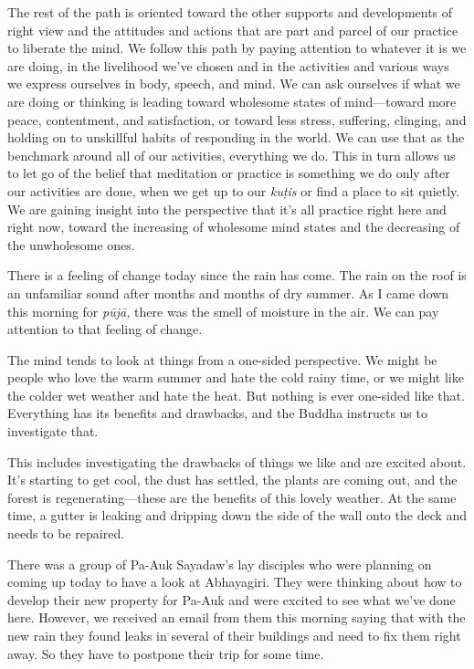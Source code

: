 The rest of the path is oriented toward the other supports and 
developments of right view and the attitudes and actions that are part 
and parcel of our practice to liberate the mind. We follow this path by 
paying attention to whatever it is we are doing, in the livelihood 
we've chosen and in the activities and various ways we express 
ourselves in body, speech, and mind. We can ask ourselves if what we 
are doing or thinking is leading toward wholesome states of 
mind---toward more peace, contentment, and satisfaction, or toward less 
stress, suffering, clinging, and holding on to unskillful habits of 
responding in the world. We can use that as the benchmark around all of 
our activities, everything we do. This in turn allows us to let go of 
the belief that meditation or practice is something we do only after 
our activities are done, when we get up to our \emph{kuṭis} or find a 
place to sit quietly. We are gaining insight into the perspective that 
it's all practice right here and right now, toward the increasing of 
wholesome mind states and the decreasing of the unwholesome ones.


There is a feeling of change today since the rain has come. The rain on 
the roof is an unfamiliar sound after months and months of dry summer. 
As I came down this morning for \emph{pūjā,} there was the smell of 
moisture in the air. We can pay attention to that feeling of change.

The mind tends to look at things from a one-sided perspective. We might 
be people who love the warm summer and hate the cold rainy time, or we 
might like the colder wet weather and hate the heat. But nothing is 
ever one-sided like that. Everything has its benefits and drawbacks, 
and the Buddha instructs us to investigate that.

This includes investigating the drawbacks of things we like and are 
excited about. It's starting to get cool, the dust has settled, the 
plants are coming out, and the forest is regenerating---these are the 
benefits of this lovely weather. At the same time, a gutter is leaking 
and dripping down the side of the wall onto the deck and needs to be 
repaired.

There was a group of Pa-Auk Sayadaw's lay disciples who were planning 
on coming up today to have a look at Abhayagiri. They were thinking 
about how to develop their new property for Pa-Auk and were excited to 
see what we've done here. However, we received an email from them this 
morning saying that with the new rain they found leaks in several of 
their buildings and need to fix them right away. So they have to 
postpone their trip for some time.

